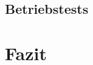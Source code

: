 \documentclass[titlepage]{report}
\begin{document}
\section{Betriebstests}
\chapter{Fazit}
\nocite{*}
\printbibliography{}
\lstlistoflistings{}
\listoftables{}
\listoffigures
\printglossary{}
\end{document}
